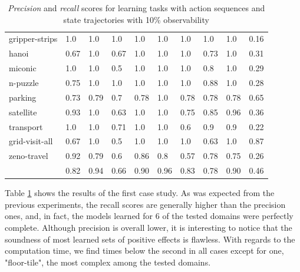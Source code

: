 \begin{table}[hbt!]
\begin{center}
\begin{tabular}{l|l|l|l|l|l|l||l|l|l|}
				gripper-strips & 1.0 & 1.0 & 1.0 & 1.0 & 1.0 & 1.0 & 1.0 & 1.0& 0.16 \\ %
				hanoi & 0.67 & 1.0 & 0.67 & 1.0 & 1.0 & 1.0 & 0.73 & 1.0& 0.31 \\ %
				miconic & 1.0 & 1.0 & 0.5 & 1.0 & 1.0 & 1.0 & 0.8 & 1.0& 0.29 \\ %
				n-puzzle & 0.75 & 1.0 & 1.0 & 1.0 & 1.0 & 1.0 & 0.88 & 1.0& 0.28 \\ %
				parking & 0.73 & 0.79 & 0.7 & 0.78 & 1.0 & 0.78 & 0.78 & 0.78& 0.65 \\ %
				satellite & 0.93 & 1.0 & 0.63 & 1.0 & 1.0 & 0.75 & 0.85 & 0.96& 0.36 \\ %
				transport & 1.0 & 1.0 & 0.71 & 1.0 & 1.0 & 0.6 & 0.9 & 0.9& 0.22 \\ %
				grid-visit-all & 0.67 & 1.0 & 0.5 & 1.0 & 1.0 & 1.0 & 0.63 & 1.0& 0.87 \\ %
				zeno-travel & 0.92 & 0.79 & 0.6 & 0.86 & 0.8 & 0.57 & 0.78 & 0.75& 0.26 \\ %
				\hline
				\bf & 0.82 & 0.94 & 0.66 & 0.90 & 0.96 & 0.83 & 0.78 & 0.90 & 0.46 \\
			\end{tabular}
			
		\end{center}
	\caption{\small {\em Precision} and {\em recall} scores for learning tasks with \FO action sequences and \PO state trajectories with 10\% observability}
	\label{tab:results_minimum_100_10}
\end{table}

Table \ref{tab:results_minimum_100_10} shows the results of the first case study. As was expected from the previous experiments, the recall scores are generally higher than the precision ones, and, in fact, the models learned for 6 of the tested domains were perfectly complete. Although precision is overall lower, it is interesting to notice that the soundness of most learned sets of positive effects is flawless. With regards to the computation time, we find times below the second in all cases except for one, "floor-tile", the most complex among the tested domains.


